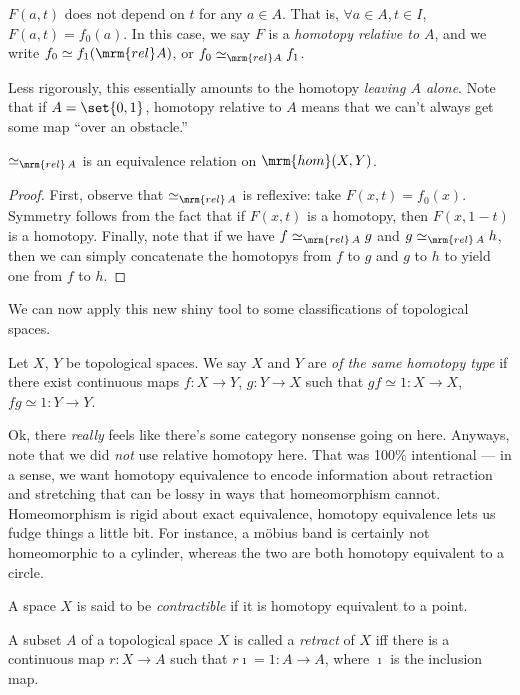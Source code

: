 \documentclass[nocover]{pset}
\newcommand{\htop}[1][A]{\ensuremath\simeq_{\mrm{rel}\, #1}}
\newcommand{\homm}{\ensuremath\mrm{hom}}
\begin{document}
\begin{adjustwidth}{1em}{1em}
\begin{definition}
    $F(a,t)$ does not depend on $t$ for any $a \in A$. That is,
    $\forall a \in A, t \in I$, $F(a,t) = f_0(a)$. In this case, we
    say $F$ is a \emph{homotopy relative to $A$}, and we write $f_0
    \simeq f_1 (\mrm{rel} A)$, or $f_0 \simeq_{\mrm{rel} A} f_1$.
  \end{definition}
  Less rigorously, this essentially amounts to the homotopy
  \emph{leaving $A$ alone}. Note that if $A = \set{0,1}$, homotopy
  relative to $A$ means that we can't always get some map ``over an
  obstacle.''
  \begin{lemma}
    $\htop$ is an equivalence relation on $\homm(X,Y)$.
  \end{lemma}
  \begin{proof}
    First, observe that $\htop$ is reflexive: take $F(x,t) = f_0(x)$.
    Symmetry follows from the fact that if $F(x,t)$ is a homotopy,
    then $F(x, 1-t)$ is a homotopy. Finally, note that if we have $f
    \htop g$ and $g \htop h$, then we can simply concatenate the
    homotopys from $f$ to $g$ and $g$ to $h$ to yield one from $f$ to
    $h$.
  \end{proof}
  We can now apply this new shiny tool to some classifications of
  topological spaces.
  \begin{definition}
    Let $X$, $Y$ be topological spaces. We say $X$ and $Y$ are
    \emph{of the same homotopy type} if there exist continuous maps $f
    : X \to Y$, $g : Y \to X$ such that $gf \simeq 1 : X \to X$, $fg
    \simeq 1 : Y \to Y$.
  \end{definition}
  Ok, there \emph{really} feels like there's some category nonsense
  going on here. Anyways, note that we did \emph{not} use relative
  homotopy here. That was 100\% intentional --- in a sense, we want
  homotopy equivalence to encode information about retraction and
  stretching that can be lossy in ways that homeomorphism cannot.
  Homeomorphism is rigid about exact equivalence, homotopy equivalence
  lets us fudge things a little bit. For instance, a m\"{o}bius band
  is certainly not homeomorphic to a cylinder, whereas the two are
  both homotopy equivalent to a circle.
  \begin{definition}
    A space $X$ is said to be \emph{contractible} if it is homotopy
    equivalent to a point.
  \end{definition}
  \begin{definition}
    A subset $A$ of a topological space $X$ is called a \emph{retract}
    of $X$ iff there is a continuous map $r : X \to A$ such that
    $r\imath = 1 : A \to A$, where $\imath$ is the inclusion map.

\end{definition}
\end{adjustwidth}
\end{document}

